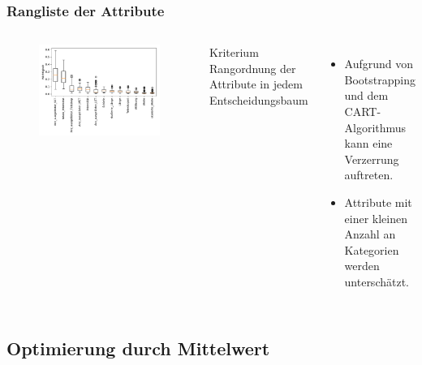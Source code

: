 \documentclass[aspectratio=1610, professionalfonts, 9pt]{beamer}
\begin{document}
  \begin{frame}
    \frametitle{Rangliste der Attribute}
    \begin{columns}
      \begin{figure}
        \includegraphics[width=\textwidth]{pictures/feautureimportance_boxplot_firstForest.pdf}
        \caption{}
        \label{}
      \end{figure}
      \begin{block}{Kriterium}
        Rangordnung der Attribute in jedem Entscheidungsbaum
      \end{block}
      \begin{itemize}
        \item Aufgrund von Bootstrapping und dem CART-Algorithmus kann eine Verzerrung auftreten.
        \item Attribute mit einer kleinen Anzahl an Kategorien werden unterschätzt.
      \end{itemize}
    \end{columns}
  \end{frame}

  \subsection{Optimierung durch Mittelwert}
\end{document}
